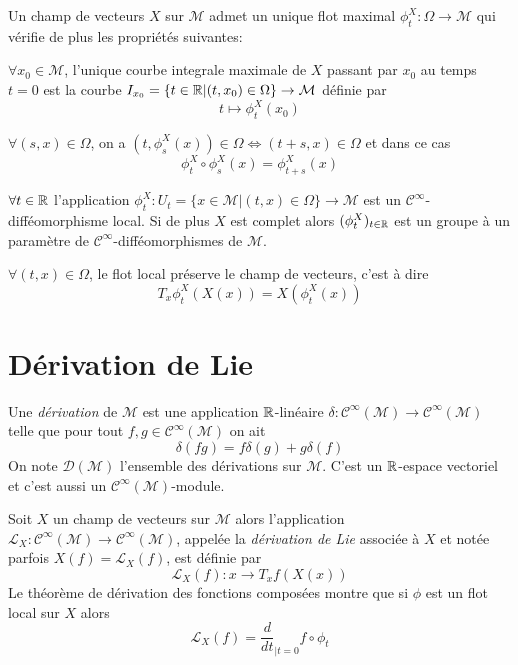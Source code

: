 \documentclass[12pt, a4paper]{book}
\begin{document}
\begin{pro}
Un champ de vecteurs $X$ sur $\mathcal{M}$ admet un unique flot maximal $\phi_t^X : \Omega \to \mathcal{M}$ qui vérifie de plus les propriétés suivantes:
\be
	\item $\forall x_0\in \mathcal{M}$, l'unique courbe integrale maximale de $X$ passant par $x_0$ au temps $t=0$ est la courbe $I_{x_0} = \{t\in \mathbb{R} | (t, x_0) \in \Omega\} \to \mathcal{M}$ définie par
	$$t \mapsto \phi_t^X(x_0)$$

	\item $\forall (s, x)\in \Omega$, on a $(t, \phi_s^X(x)) \in \Omega \iff (t+s, x) \in \Omega$ et dans ce cas
	$$\phi_t^X \circ \phi_s^X(x) = \phi_{t+s}^X(x)$$

	\item $\forall t\in \mathbb{R}$ l'application $\phi_t^X : U_t = \{x\in \mathcal{M} | (t, x) \in \Omega \} \to \mathcal{M}$ est un $\mathscr{C}^\infty$-difféomorphisme local. Si de plus $X$ est complet alors $(\phi_t^X)_{t\in\mathbb{R}}$ est un groupe à un paramètre de $\mathscr{C}^\infty$-difféomorphismes de $\mathcal{M}$. 

	\item $\forall (t,x) \in \Omega$, le flot local préserve le champ de vecteurs, c'est à dire 
	$$T_x\phi_t^X(X(x)) = X(\phi_t^X(x))$$
\ee
\end{pro}

\newpage
\section{Dérivation de Lie}

\begin{defi}[Dérivation]
Une \emph{dérivation} de $\mathcal{M}$ est une application $\mathbb{R}$-linéaire $\delta : \mathscr{C}^\infty(\mathcal{M}) \to \mathscr{C}^\infty(\mathcal{M})$ telle que pour tout $f, g \in \mathscr{C}^\infty(\mathcal{M})$ on ait
$$\delta(fg) = f\delta(g) + g\delta(f)$$
On note $\mathscr{D}(\mathcal{M})$ l'ensemble des dérivations sur $\mathcal{M}$. C'est un $\mathbb{R}$-espace vectoriel et c'est aussi un $\mathscr{C}^\infty(\mathcal{M})$-module.
\end{defi}

\begin{defi}
Soit $X$ un champ de vecteurs sur $\mathcal{M}$ alors l'application $\mathscr{L}_X: \mathscr{C}^\infty(\mathcal{M}) \to \mathscr{C}^\infty(\mathcal{M})$, appelée la \emph{dérivation de Lie} associée à $X$ et notée parfois $X(f) = \mathscr{L}_X(f)$, est définie par 
$$\mathscr{L}_X(f): x\to T_xf(X(x))$$
Le théorème de dérivation des fonctions composées montre que si $\phi$ est un flot local sur $X$ alors
$$\mathscr{L}_X(f) = \frac{d}{dt}_{|t = 0}f\circ\phi_t$$
\end{defi}
\end{document}
